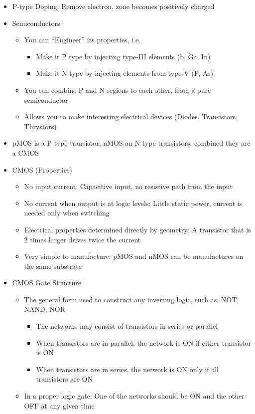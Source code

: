 \documentclass[a4paper]{article}
\begin{document}
\begin{itemize}
\item P-type Doping: Remove electron, zone becomes positively charged
\item Semiconductors:
\begin{itemize}
\item You can ``Engineer'' its properties, i.e.
\begin{itemize}
\item Make it P type by injecting type-III elements (b, Ga, In)
\item Make it N type by injecting elements from type-V (P, As)
\end{itemize}
\item You can combine P and N regions to each other, from a pure semiconductor
\item Allows you to make interesting electrical devices (Diodes, Transistors, Thrystors)
\end{itemize}
\item pMOS is a P type transistor, nMOS an N type transistors; combined they are a CMOS
\item CMOS (Properties)
\begin{itemize}
\item No input current: Capacitive input, no resistive path from the input
\item No current when output is at logic levels: Little static power, current is needed only when switching
\item Electrical properties determined directly by geometry: A transistor that is 2 times larger drives twice the current
\item Very simple to manufacture: pMOS and nMOS can be manufactures on the same substrate
\end{itemize}
\item CMOS Gate Structure
\begin{itemize}
\item The general form used to construct any inverting logic, such as: NOT, NAND, NOR
\begin{itemize}
\item The networks may consist of transistors in series or parallel
\item When transistors are in parallel, the network is ON if either transistor is ON
\item When transistors are in series, the network is ON only if all transistors are ON
\end{itemize}
\item In a proper logic gate: One of the networks should be ON and the other OFF at any given time

\end{itemize}
\end{itemize}
\end{document}
